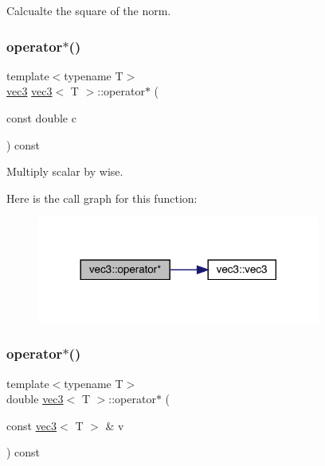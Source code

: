 Calcualte the square of the norm. 

\mbox{\label{structvec3_a0f446233cd7b3fe50bc3d773c85177d5}} 
\subsubsection{\texorpdfstring{operator$\ast$()}{operator*()}\hspace{0.1cm}{\footnotesize\ttfamily [1/2]}}
{\footnotesize\ttfamily template$<$typename T$>$ \\
\mbox{\hyperlink{structvec3}{vec3}} \mbox{\hyperlink{structvec3}{vec3}}$<$ T $>$\+::operator$\ast$ (\begin{DoxyParamCaption}\item[{const double}]{c }\end{DoxyParamCaption}) const\hspace{0.3cm}{\ttfamily [inline]}}



Multiply scalar by wise. 

Here is the call graph for this function\+:\nopagebreak
\begin{figure}[H]
\begin{center}
\leavevmode
\includegraphics[width=264pt]{structvec3_a0f446233cd7b3fe50bc3d773c85177d5_cgraph}
\end{center}
\end{figure}
\mbox{\label{structvec3_adf6b983e98aca9730b8cabce92a8affd}} 
\subsubsection{\texorpdfstring{operator$\ast$()}{operator*()}\hspace{0.1cm}{\footnotesize\ttfamily [2/2]}}
{\footnotesize\ttfamily template$<$typename T$>$ \\
double \mbox{\hyperlink{structvec3}{vec3}}$<$ T $>$\+::operator$\ast$ (\begin{DoxyParamCaption}\item[{const \mbox{\hyperlink{structvec3}{vec3}}$<$ T $>$ \&}]{v }\end{DoxyParamCaption}) const\hspace{0.3cm}{\ttfamily [inline]}}



